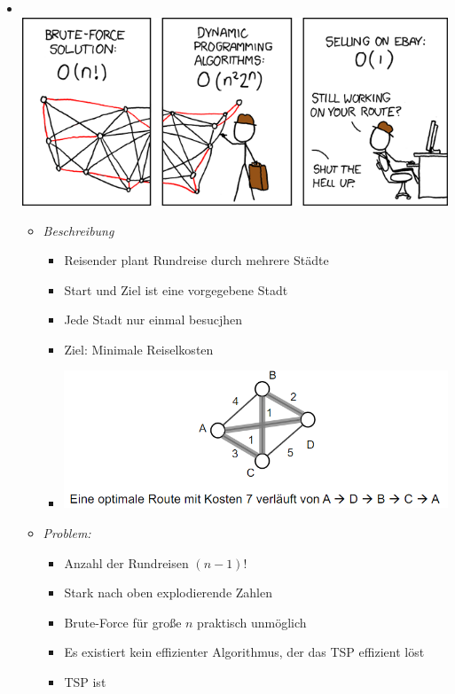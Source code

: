 \documentclass[
    12pt,
    a4paper,
    ngerman,
    color=3b,%
    marginpar=false,
    colorback=false,
    leqno,
]{tudaexercise}
\begin{document}
\begin{itemize}
          \pagebreak

    \item {}\\
          \includegraphics[width=.5\textwidth]{pictures/traveling_salesman.png}
    \begin{itemize}
              \item \textit{Beschreibung}
                    \begin{itemize}
                        \item Reisender plant Rundreise durch mehrere Städte
                        \item Start und Ziel ist eine vorgegebene Stadt
                        \item Jede Stadt nur einmal besucjhen
                        \item Ziel: Minimale Reiselkosten
                        \item[] \includegraphics[width=12cm]{pictures/tsp1.PNG}
                    \end{itemize}
              \item \textit{Problem:}
                    \begin{itemize}
                        \item Anzahl der Rundreisen $(n-1)!$
                        \item Stark nach oben explodierende Zahlen
                        \item Brute-Force für große $n$ praktisch unmöglich
                        \item Es existiert kein effizienter Algorithmus, der das TSP effizient löst
                        \item TSP ist 

\end{itemize}
\end{itemize}
\end{itemize}
\end{document}
